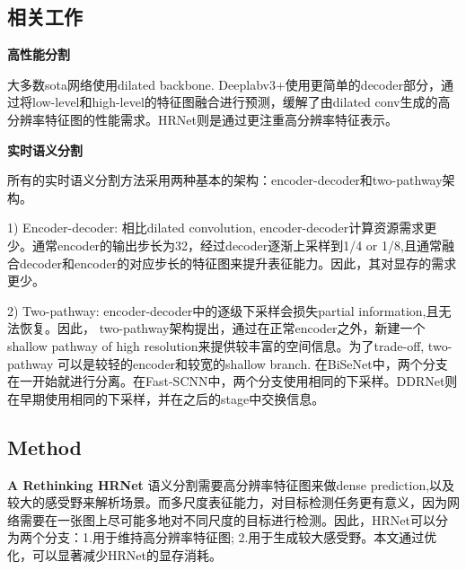 \documentclass{article}
\begin{document}
\subsection{相关工作}
\textbf{高性能分割}

大多数sota网络使用dilated backbone. Deeplabv3+使用更简单的decoder部分，通过将low-level和high-level的特征图融合进行预测，缓解了由dilated conv生成的高分辨率特征图的性能需求。HRNet则是通过更注重高分辨率特征表示。

\textbf{实时语义分割}

所有的实时语义分割方法采用两种基本的架构：encoder-decoder和two-pathway架构。

1) Encoder-decoder: 相比dilated convolution, encoder-decoder计算资源需求更少。通常encoder的输出步长为32，经过decoder逐渐上采样到1/4 or 1/8,且通常融合decoder和encoder的对应步长的特征图来提升表征能力。因此，其对显存的需求更少。

2) Two-pathway: encoder-decoder中的逐级下采样会损失partial information,且无法恢复。因此， two-pathway架构提出，通过在正常encoder之外，新建一个shallow pathway of high resolution来提供较丰富的空间信息。为了trade-off, two-pathway 可以是较轻的encoder和较宽的shallow branch. 在BiSeNet中，两个分支在一开始就进行分离。在Fast-SCNN中，两个分支使用相同的下采样。DDRNet则在早期使用相同的下采样，并在之后的stage中交换信息。

\subsection{Method}
\textbf{A Rethinking HRNet}
语义分割需要高分辨率特征图来做dense prediction,以及较大的感受野来解析场景。而多尺度表征能力，对目标检测任务更有意义，因为网络需要在一张图上尽可能多地对不同尺度的目标进行检测。因此，HRNet可以分为两个分支：1.用于维持高分辨率特征图; 2.用于生成较大感受野。本文通过优化，可以显著减少HRNet的显存消耗。
\end{document}
